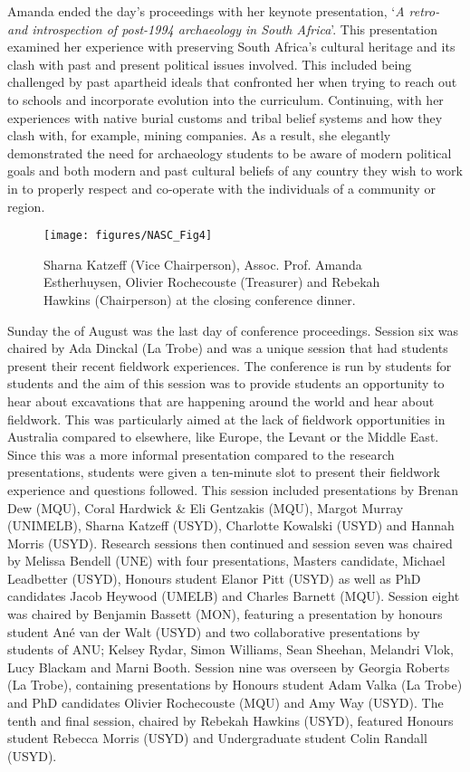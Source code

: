 Amanda ended the day’s proceedings with her keynote presentation, ‘\textit{A retro- and introspection of post-1994 archaeology in South Africa}’. This presentation examined her experience with preserving South Africa’s cultural heritage and its clash with past and present political issues involved. This included being challenged by past apartheid ideals that confronted her when trying to reach out to schools and incorporate evolution into the curriculum. Continuing, with her experiences with native burial customs and tribal belief systems and how they clash with, for example, mining companies. As a result, she elegantly demonstrated the need for archaeology students to be aware of modern political goals and both modern and past cultural beliefs of any country they wish to work in to properly respect and co-operate with the individuals of a community or region. 


\begin{figure}
	\texttt{[image: figures/NASC\_Fig4]}
	\centering
	\caption{Sharna Katzeff (Vice Chairperson), Assoc. Prof. Amanda Estherhuysen, Olivier Rochecouste (Treasurer) and Rebekah Hawkins (Chairperson) at the closing conference dinner.}
	\label{fig:NASC_Fig4}
\end{figure}


Sunday the  of August was the last day of conference proceedings. Session six was chaired by Ada Dinckal (La Trobe) and was a unique session that had students present their recent fieldwork experiences. The conference is run by students for students and the aim of this session was to provide students an opportunity to hear about excavations that are happening around the world and hear about fieldwork. This was particularly aimed at the lack of fieldwork opportunities in Australia compared to elsewhere, like Europe, the Levant or the Middle East. Since this was a more informal presentation compared to the research presentations, students were given a ten-minute slot to present their fieldwork experience and questions followed. This session included presentations by Brenan Dew (MQU), Coral Hardwick \& Eli Gentzakis (MQU), Margot Murray (UNIMELB), Sharna Katzeff (USYD), Charlotte Kowalski (USYD) and Hannah Morris (USYD). Research sessions then continued and session seven was chaired by Melissa Bendell (UNE) with four presentations, Masters candidate, Michael Leadbetter (USYD), Honours student Elanor Pitt (USYD) as well as PhD candidates Jacob Heywood (UMELB) and Charles Barnett (MQU). Session eight was chaired by Benjamin Bassett (MON), featuring a presentation by honours student Ané van der Walt (USYD) and two collaborative presentations by students of ANU; Kelsey Rydar, Simon Williams, Sean Sheehan, Melandri Vlok, Lucy Blackam and Marni Booth. Session nine was overseen by Georgia Roberts (La Trobe), containing presentations by Honours student Adam Valka (La Trobe) and PhD candidates Olivier Rochecouste (MQU) and Amy Way (USYD). The tenth and final session, chaired by Rebekah Hawkins (USYD), featured Honours student Rebecca Morris (USYD) and Undergraduate student Colin Randall (USYD). 

